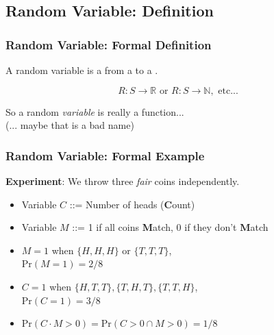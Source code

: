 \documentclass{beamer}
\begin{document}
\subsection{Random Variable: Definition}
\begin{frame}
  \frametitle{Random Variable: Formal Definition}

  A random variable is a  from a
   to a .

  \bigskip
  \begin{equation}
    R: S \to \mathbb{R} \text{ or } R: S \to \mathbb{N}, \text{ etc...}
  \end{equation}

  \vfill

  So a random \emph{variable} is really a \alert{function}...\\
  \hfill (... maybe that is a bad name)
\end{frame}

\begin{frame}
  \frametitle{Random Variable: Formal Example}

  {\bf Experiment}: We throw three \emph{fair} coins independently.
  \begin{itemize}
  \item Variable $C$ ::= Number of heads ({\bf C}ount)
  \item Variable $M$ ::= 1 if all coins {\bf M}atch, 0 if they don't {\bf M}atch
  \end{itemize}

  \vfill

  \begin{itemize}
  \item $M = 1$ when $\{H,H,H\}$ or $\{T,T,T\}$, \\
    Pr$(M=1) = 2/8$
    \bigskip
    
  \item $C = 1$ when $\{H,T,T\},\{T,H,T\},\{T,T,H\}$, \\
    Pr$(C=1) = 3/8$
    \bigskip

  \item Pr$(C\cdot M > 0) = \text{Pr}(C>0 \cap M>0) = 1/8$
  \end{itemize}
\end{frame}
\end{document}
